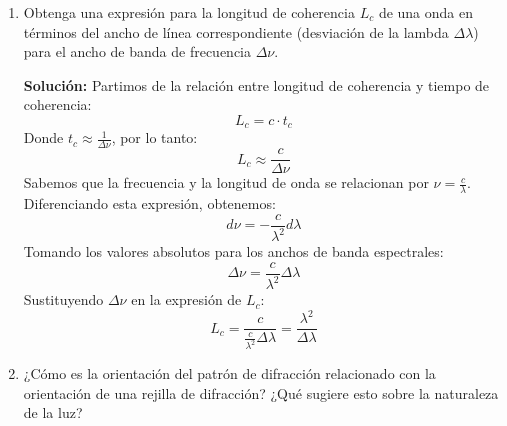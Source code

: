 \documentclass[12pt, letterpaper]{article}
\begin{document}
\begin{enumerate}
		\begin{itemize}
			\item \textbf{Luz Azul} ($\lambda = 450\text{ nm}$):\\
			$L_c = \frac{(450 \times 10^{-9}\text{ m})^2}{20 \times 10^{-9}\text{ m}} = 10.125 \mu\text{m}$ \\
			$t_c = \frac{10.125 \times 10^{-6}\text{ m}}{3 \times 10^8\text{ m/s}} \approx 33.75\text{ fs}$
			
			\item \textbf{Luz Verde} ($\lambda = 532\text{ nm}$):\\
			$L_c = \frac{(532 \times 10^{-9}\text{ m})^2}{20 \times 10^{-9}\text{ m}} \approx 14.15\mu\text{m}$ \\
			$t_c = \frac{14.15 \times 10^{-6}\text{ m}}{3 \times 10^8\text{ m/s}} \approx 47.1\text{ fs}$
			
			\item \textbf{Luz Roja} ($\lambda = 650\text{ nm}$):\\
			$L_c = \frac{(650 \times 10^{-9}\text{ m})^2}{20 \times 10^{-9}\text{ m}} = 21.125\mu\text{m}$ \\
			$t_c = \frac{21.125 \times 10^{-6}\text{ m}}{3 \times 10^8\text{ m/s}} \approx 70.4\text{ fs}$
		\end{itemize}
		
		\item Obtenga una expresión para la longitud de coherencia $L_c$ de una onda en términos del ancho de línea correspondiente (desviación de la lambda $\Delta\lambda$) para el ancho de banda de frecuencia $\Delta\nu$.
		
		\textbf{Solución:}
		Partimos de la relación entre longitud de coherencia y tiempo de coherencia:
		$$ L_c = c \cdot t_c $$
		Donde $t_c \approx \frac{1}{\Delta\nu}$, por lo tanto:
		$$ L_c \approx \frac{c}{\Delta\nu} $$
		Sabemos que la frecuencia y la longitud de onda se relacionan por $\nu = \frac{c}{\lambda}$. Diferenciando esta expresión, obtenemos:
		$$ d\nu = -\frac{c}{\lambda^2} d\lambda $$
		Tomando los valores absolutos para los anchos de banda espectrales:
		$$ \Delta\nu = \frac{c}{\lambda^2} \Delta\lambda $$
		Sustituyendo $\Delta\nu$ en la expresión de $L_c$:
		$$ L_c = \frac{c}{\frac{c}{\lambda^2} \Delta\lambda} = \frac{\lambda^2}{\Delta\lambda} $$
		
		\item ¿Cómo es la orientación del patrón de difracción relacionado con la orientación de una rejilla de difracción? ¿Qué sugiere esto sobre la naturaleza de la luz? 
		

\end{enumerate}
\end{document}
